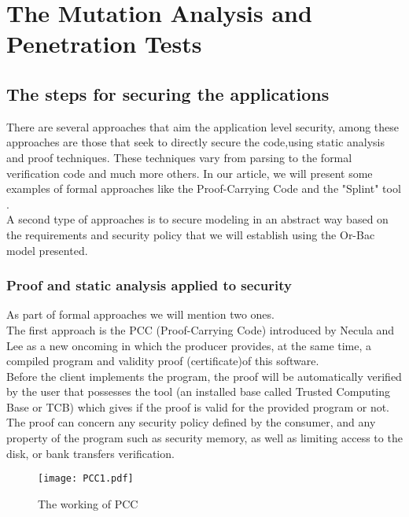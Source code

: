\documentclass{acm_proc_article-sp}
\begin{document}
\section{The Mutation Analysis and Penetration Tests}
\subsection{The steps for securing the applications}
There are several approaches that aim the application level security, among these approaches are those that seek to directly secure the code,using static analysis and proof techniques. These techniques vary from parsing to the formal verification code and much more others. In our article, we will present some examples of formal approaches like the Proof-Carrying Code \cite{Besson:2006:PCC:1226601.1226603} and the "Splint" tool \cite{Evans:2002:ISU:624647.626359}.\\
A second type of approaches is to secure modeling in an abstract way based on the requirements and security policy that we will establish using the Or-Bac model presented.

\subsubsection{Proof and static analysis applied to security}
As part of formal approaches we will mention two ones.\\
The first approach is the PCC (Proof-Carrying Code) introduced by Necula and Lee as a new oncoming in which the producer provides, at the same time, a compiled program and validity proof (certificate)of this software. \\
Before the client implements the program, the proof will be automatically verified by the user that possesses the tool (an installed base called Trusted Computing Base or TCB) which gives if the proof is valid for the provided program or not.\\
The proof can concern any security policy defined by the consumer, and any property of the program such as security memory, as well as limiting access to the disk, or bank transfers verification.\\
\begin{figure}[h!]                                                       \centering                                                               \texttt{[image: PCC1.pdf]}                       \caption{The working of PCC}                                             \label{The working of PCC}                                               \end{figure}                                                             
\end{document}
